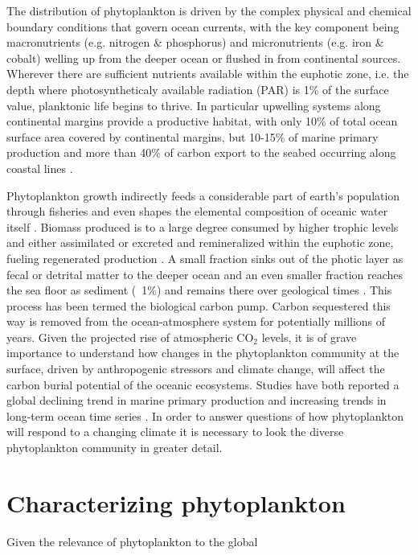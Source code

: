 The distribution of phytoplankton is driven by the complex physical and chemical boundary conditions that govern ocean currents, with the key component being macronutrients (e.g. nitrogen \& phosphorus) and micronutrients (e.g. iron \& cobalt) welling up from the deeper ocean or flushed in from continental sources. Wherever there are sufficient nutrients available within the euphotic zone, i.e. the depth where photosyntheticaly available radiation (PAR) is 1\% of the surface value, planktonic life begins to thrive. In particular upwelling systems along continental margins provide a productive habitat, with only 10\% of total ocean surface area covered by continental margins, but 10-15\% of marine primary production and more than 40\% of carbon export to the seabed occurring along coastal lines \citep{Yool2001,Muller-Karger2005}.


Phytoplankton growth indirectly feeds a considerable part of earth’s population through fisheries \citep{Stock2017} and even shapes the elemental composition of oceanic water itself \citep{Redfield1958}. Biomass produced is to a large degree consumed by higher trophic levels and either assimilated or excreted and remineralized within the euphotic zone, fueling regenerated production \citep{Eppley1979}. A small fraction sinks out of the photic layer as fecal or detrital matter to the deeper ocean and an even smaller fraction reaches the sea floor as sediment (~1\%) and remains there over geological times \citep{Honjo2008}. This process has been termed the biological carbon pump. Carbon sequestered this way is removed from the ocean-atmosphere system for potentially millions of years. Given the projected rise of atmospheric CO$_2$ levels, it is of grave importance to understand how changes in the phytoplankton community at the surface, driven by anthropogenic stressors and climate change, will affect the carbon burial potential of the oceanic ecosystems. Studies have both reported a global declining trend in marine primary production \citep{Boyce2012} and increasing trends in long-term ocean time series \citep{Chavez2011a}. In order to answer questions of how phytoplankton will respond to a changing climate it is necessary to look the diverse phytoplankton community in greater detail. 

\section{Characterizing phytoplankton}

Given the relevance of phytoplankton to the global 

